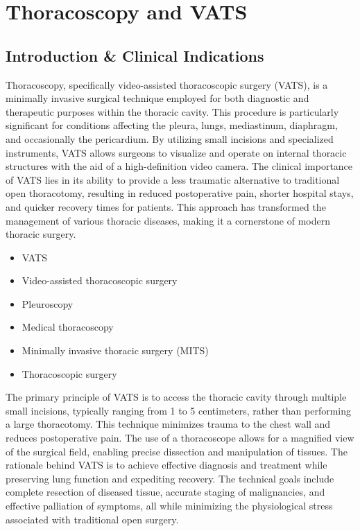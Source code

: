 \chapter{Thoracoscopy and VATS}

\section*{Introduction \& Clinical Indications}
Thoracoscopy, specifically video-assisted thoracoscopic surgery (VATS), is a minimally invasive surgical technique employed for both diagnostic and therapeutic purposes within the thoracic cavity. This procedure is particularly significant for conditions affecting the pleura, lungs, mediastinum, diaphragm, and occasionally the pericardium. By utilizing small incisions and specialized instruments, VATS allows surgeons to visualize and operate on internal thoracic structures with the aid of a high-definition video camera. The clinical importance of VATS lies in its ability to provide a less traumatic alternative to traditional open thoracotomy, resulting in reduced postoperative pain, shorter hospital stays, and quicker recovery times for patients. This approach has transformed the management of various thoracic diseases, making it a cornerstone of modern thoracic surgery.

\begin{itemize}
  \item VATS
  \item Video-assisted thoracoscopic surgery
  \item Pleuroscopy
  \item Medical thoracoscopy
  \item Minimally invasive thoracic surgery (MITS)
  \item Thoracoscopic surgery
\end{itemize}

The primary principle of VATS is to access the thoracic cavity through multiple small incisions, typically ranging from 1 to 5 centimeters, rather than performing a large thoracotomy. This technique minimizes trauma to the chest wall and reduces postoperative pain. The use of a thoracoscope allows for a magnified view of the surgical field, enabling precise dissection and manipulation of tissues. The rationale behind VATS is to achieve effective diagnosis and treatment while preserving lung function and expediting recovery. The technical goals include complete resection of diseased tissue, accurate staging of malignancies, and effective palliation of symptoms, all while minimizing the physiological stress associated with traditional open surgery.

